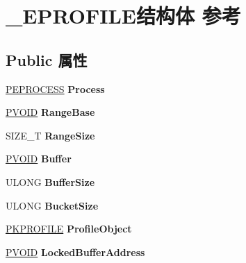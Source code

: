 \hypertarget{struct___e_p_r_o_f_i_l_e}{}\section{\+\_\+\+E\+P\+R\+O\+F\+I\+L\+E结构体 参考}
\label{struct___e_p_r_o_f_i_l_e}
\subsection*{Public 属性}
\begin{DoxyCompactItemize}
\item 
\mbox{\label{struct___e_p_r_o_f_i_l_e_a9b08e839fdcc1280475fd5bb1f9d91a0}} 
\hyperlink{struct___e_p_r_o_c_e_s_s}{P\+E\+P\+R\+O\+C\+E\+SS} {\bfseries Process}
\item 
\mbox{\label{struct___e_p_r_o_f_i_l_e_a5498382fd6a02bdc3e33a9c5a2b4b4c4}} 
\hyperlink{interfacevoid}{P\+V\+O\+ID} {\bfseries Range\+Base}
\item 
\mbox{\label{struct___e_p_r_o_f_i_l_e_a94f9c52b2e66b38ee90e7535af08c133}} 
S\+I\+Z\+E\+\_\+T {\bfseries Range\+Size}
\item 
\mbox{\label{struct___e_p_r_o_f_i_l_e_af11208619fa3042d088d6c9c8bb32b1c}} 
\hyperlink{interfacevoid}{P\+V\+O\+ID} {\bfseries Buffer}
\item 
\mbox{\label{struct___e_p_r_o_f_i_l_e_a6fdc89d60f0f5b72346d3fe9634a896c}} 
U\+L\+O\+NG {\bfseries Buffer\+Size}
\item 
\mbox{\label{struct___e_p_r_o_f_i_l_e_a428999b4613373eff9485aa79a0a9a77}} 
U\+L\+O\+NG {\bfseries Bucket\+Size}
\item 
\mbox{\label{struct___e_p_r_o_f_i_l_e_a1ad9fcd0e6d1b3563eb30e9946435100}} 
\hyperlink{struct___k_p_r_o_f_i_l_e}{P\+K\+P\+R\+O\+F\+I\+LE} {\bfseries Profile\+Object}
\item 
\mbox{\label{struct___e_p_r_o_f_i_l_e_a0c78fdf89fc5226ccda8367af07f03ea}} 
\hyperlink{interfacevoid}{P\+V\+O\+ID} {\bfseries Locked\+Buffer\+Address}

\end{DoxyCompactItemize}
